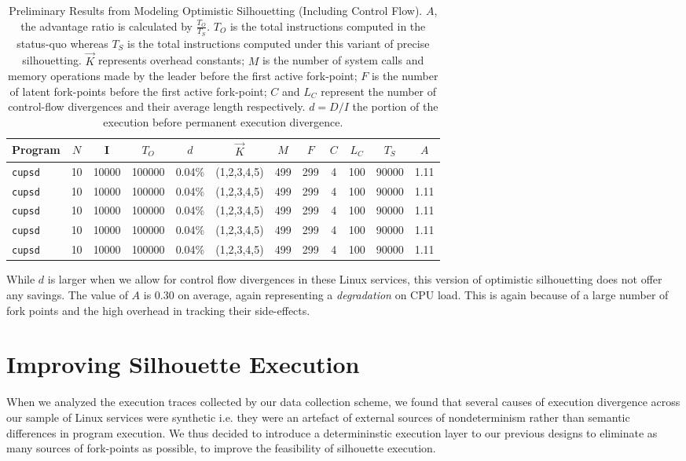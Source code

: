 \begin{table}[h]
  \caption{Preliminary Results from Modeling Optimistic Silhouetting (Including Control Flow). \newline \newline 
  $A$, the advantage ratio is calculated by $\frac{T_O}{T_S}$.
  $T_O$ is the total instructions computed in the status-quo whereas $T_S$ is the total instructions computed under
  this variant of precise silhouetting. $\vec K$ represents overhead constants; $M$ is the number
  of system calls and memory operations made by the leader before the first active fork-point; $F$
  is the number of latent fork-points before the first active fork-point;
  $C$ and $L_C$ represent the number of control-flow divergences and their average length
  respectively.  $d = D/I$
  the portion of the execution before permanent execution divergence. }
\label{osc:inittbl}
\begin{center}
\begin{tabular}{|l||c|c||c||c|c|c|c|c|c||c||c|}\hline
  Program & $N$ & I & $T_O$ & $d$ & $\vec K$ & $M$ & $F$ & $C$& $L_C$ &$T_S$ & $A$ \\\hline
  \texttt{cupsd} & 10 & 10000 & 100000 & 0.04\% & (1,2,3,4,5) & 499 & 299 & 4 & 100 & 90000 & 1.11  \\\hline
  \texttt{cupsd} & 10 & 10000 & 100000 & 0.04\% & (1,2,3,4,5) & 499 & 299 & 4 & 100 & 90000 & 1.11  \\\hline
  \texttt{cupsd} & 10 & 10000 & 100000 & 0.04\% & (1,2,3,4,5) & 499 & 299 & 4 & 100 & 90000 & 1.11  \\\hline
  \texttt{cupsd} & 10 & 10000 & 100000 & 0.04\% & (1,2,3,4,5) & 499 & 299 & 4 & 100 & 90000 & 1.11  \\\hline
  \texttt{cupsd} & 10 & 10000 & 100000 & 0.04\% & (1,2,3,4,5) & 499 & 299 & 4 & 100 & 90000 & 1.11  \\\hline
\end{tabular}
\end{center}
\end{table}

While $d$ is larger when we allow for control flow divergences
in these Linux services, this version of 
optimistic silhouetting does not offer any savings.
The value of $A$ is 0.30
on average, again representing a {\em degradation}
on CPU load.
This is again because of a large 
number of fork points and the high overhead
in tracking their side-effects. 

\newpage
\section{Improving Silhouette Execution} \label{silimprove}
When we analyzed the execution
traces collected by our data collection scheme,
we found that several causes of execution
divergence across our sample
of Linux services were synthetic i.e. they were an artefact
of external sources of nondeterminism
rather than semantic differences in program execution.
We thus decided to introduce a determininstic
execution layer to our previous
designs to eliminate as many sources of 
fork-points as possible, to 
improve the feasibility
of silhouette execution.

